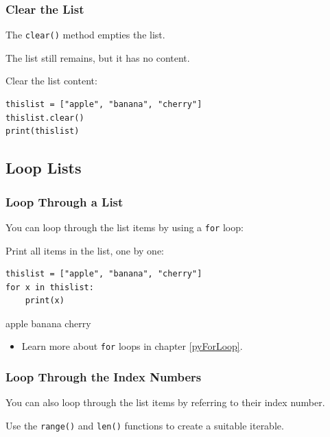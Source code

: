 \documentclass[12pt,a4paper]{article}
\newcommand{\code}[1]{%
	\colorbox{backcolour}{\lstinline{#1}}%
}
\begin{document}
\subsubsection{Clear the List}

The \code{clear()} method empties the list.

The list still remains, but it has no content.

\begin{ebox}
Clear the list content:
	\begin{lstlisting}
thislist = ["apple", "banana", "cherry"]
thislist.clear()
print(thislist)
	\end{lstlisting}
\tcblower
	\begin{vercode}
[]
	\end{vercode}
\end{ebox}
\subsection{Loop Lists}
\subsubsection{Loop Through a List}

You can loop through the list items by using a \code{for} loop:

\begin{ebox}
Print all items in the list, one by one:
	\begin{lstlisting}
thislist = ["apple", "banana", "cherry"]
for x in thislist:
    print(x)
	\end{lstlisting}
\tcblower
	\begin{vercode}
apple
banana
cherry
	\end{vercode}
\end{ebox}

\begin{itemize}
	\item Learn more about \code{for} loops in chapter \ref{pyForLoop}.
\end{itemize}
\subsubsection{Loop Through the Index Numbers}

You can also loop through the list items by referring to their index number.

Use the \code{range()} and \code{len()} functions to create a suitable iterable.
\end{document}
